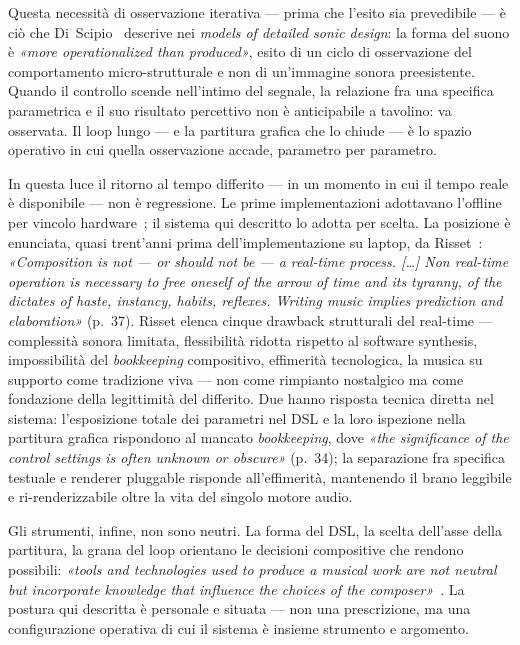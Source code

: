 \documentclass[10pt,twocolumn,a4paper]{article}
\begin{document}
Questa necessità di osservazione iterativa --- prima che l'esito sia
prevedibile --- è ciò che Di~Scipio~\cite{DiScipio1994} descrive nei
\emph{models of detailed sonic design}: la forma del suono è
\emph{«more operationalized than produced»}, esito di un ciclo di
osservazione del comportamento micro-strutturale e non di un'immagine
sonora preesistente. Quando il controllo scende nell'intimo del segnale,
la relazione fra una specifica parametrica e il suo risultato percettivo
non è anticipabile a tavolino: va osservata. Il loop lungo --- e la
partitura grafica che lo chiude --- è lo spazio operativo in cui quella
osservazione accade, parametro per parametro.

In questa luce il ritorno al tempo differito --- in un momento in cui il
tempo reale è disponibile --- non è regressione. Le prime implementazioni
adottavano l'offline per vincolo hardware~\cite{Roads1978,DiScipio1991cim};
il sistema qui descritto lo adotta per scelta. La posizione è enunciata,
quasi trent'anni prima dell'implementazione su laptop, da
Risset~\cite{Risset1999}: \emph{«Composition is not --- or should not be
--- a real-time process. [\dots] Non real-time operation is necessary to
free oneself of the arrow of time and its tyranny, of the dictates of
haste, instancy, habits, reflexes. Writing music implies prediction and
elaboration»} (p.~37). Risset elenca cinque drawback strutturali del
real-time --- complessità sonora limitata, flessibilità ridotta rispetto
al software synthesis, impossibilità del \emph{bookkeeping} compositivo,
effimerità tecnologica, la musica su supporto come tradizione viva ---
non come rimpianto nostalgico ma come fondazione della legittimità del
differito. Due hanno risposta tecnica diretta nel sistema: l'esposizione
totale dei parametri nel DSL e la loro ispezione nella partitura grafica
rispondono al mancato \emph{bookkeeping}, dove \emph{«the significance of
the control settings is often unknown or obscure»} (p.~34); la
separazione fra specifica testuale e renderer pluggable risponde
all'effimerità, mantenendo il brano leggibile e ri-renderizzabile oltre
la vita del singolo motore audio.

Gli strumenti, infine, non sono neutri. La forma del DSL, la scelta
dell'asse della partitura, la grana del loop orientano le decisioni
compositive che rendono possibili: \emph{«tools and technologies used to
produce a musical work are not neutral but incorporate knowledge that
influence the choices of the composer»}~\cite{Arcella2012}. La postura
qui descritta è personale e situata --- non una prescrizione, ma una
configurazione operativa di cui il sistema è insieme strumento e
argomento.
\end{document}
